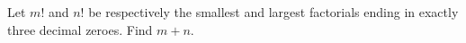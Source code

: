 Let $m!$ and $n!$ be respectively the smallest and largest factorials ending in exactly three decimal zeroes. Find $m+n$.
